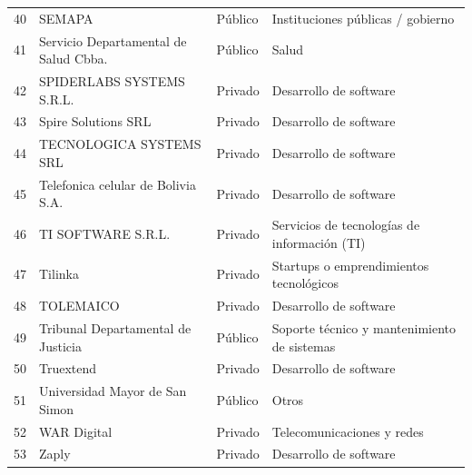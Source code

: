 {\begin{longtable}{rL{6.2cm}lL{4.6cm}}
40 & SEMAPA & Público & Instituciones públicas / gobierno \\
41 & Servicio Departamental de Salud Cbba. & Público & Salud \\
42 & SPIDERLABS SYSTEMS S.R.L. & Privado & Desarrollo de software \\
43 & Spire Solutions SRL & Privado & Desarrollo de software \\
44 & TECNOLOGICA SYSTEMS SRL & Privado & Desarrollo de software \\
45 & Telefonica celular de Bolivia S.A. & Privado & Desarrollo de software \\
46 & TI SOFTWARE S.R.L. & Privado & Servicios de tecnologías de información (TI) \\
47 & Tilinka & Privado & Startups o emprendimientos tecnológicos \\
48 & TOLEMAICO & Privado & Desarrollo de software \\
49 & Tribunal Departamental de Justicia & Público & Soporte técnico y mantenimiento de sistemas \\
50 & Truextend & Privado & Desarrollo de software \\
51 & Universidad Mayor de San Simon & Público & Otros \\
52 & WAR Digital & Privado & Telecomunicaciones y redes \\
53 & Zaply & Privado & Desarrollo de software \\
\end{longtable}
}

